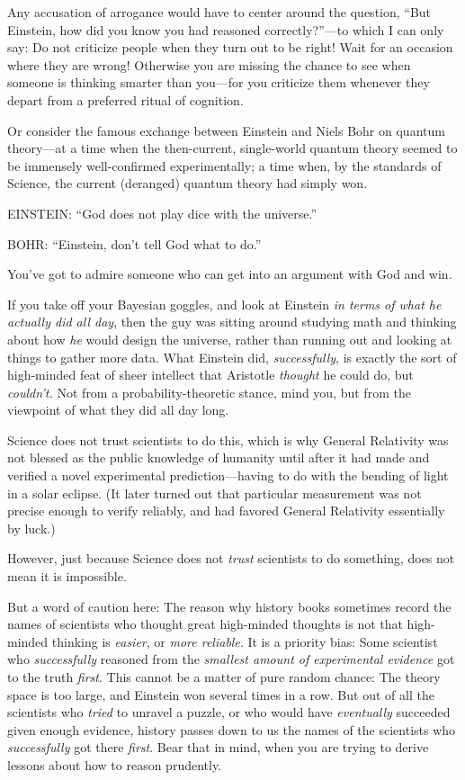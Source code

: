 {
 Any accusation of arrogance would have to center around the
question, ``But Einstein, how did you know you had
reasoned correctly?''---to which I can only say: Do
not criticize people when they turn out to be right! Wait for an
occasion where they are wrong! Otherwise you are missing the chance to
see when someone is thinking smarter than you---for you criticize them
whenever they depart from a preferred ritual of cognition.}

{
 Or consider the famous exchange between Einstein and Niels Bohr on
quantum theory---at a time when the then-current, single-world quantum
theory seemed to be immensely well-confirmed experimentally; a time
when, by the standards of Science, the current (deranged) quantum
theory had simply won.}

{
 EINSTEIN: ``God does not play dice with the
universe.''}

{
 BOHR: ``Einstein, don't tell God
what to do.''}

{
 You've got to admire someone who can get into an
argument with God and win.}

{
 If you take off your Bayesian goggles, and look at Einstein
\textit{in terms of what he actually did all day}, then the guy was
sitting around studying math and thinking about how \textit{he} would
design the universe, rather than running out and looking at things to
gather more data. What Einstein did, \textit{successfully}, is exactly
the sort of high-minded feat of sheer intellect that Aristotle
\textit{thought} he could do, but \textit{couldn't.}
Not from a probability-theoretic stance, mind you, but from the
viewpoint of what they did all day long.}

{
 Science does not trust scientists to do this, which is why General
Relativity was not blessed as the public knowledge of humanity until
after it had made and verified a novel experimental prediction---having
to do with the bending of light in a solar eclipse. (It later turned
out that particular measurement was not precise enough to verify
reliably, and had favored General Relativity essentially by luck.)}

{
 However, just because Science does not \textit{trust} scientists
to do something, does not mean it is impossible.}

{
 But a word of caution here: The reason why history books sometimes
record the names of scientists who thought great high-minded thoughts
is not that high-minded thinking is \textit{easier}, or \textit{more
reliable}. It is a priority bias: Some scientist who
\textit{successfully} reasoned from the \textit{smallest amount of
experimental evidence} got to the truth \textit{first}. This cannot be
a matter of pure random chance: The theory space is too large, and
Einstein won several times in a row. But out of all the scientists who
\textit{tried} to unravel a puzzle, or who would have
\textit{eventually} succeeded given enough evidence, history passes
down to us the names of the scientists who \textit{successfully} got
there \textit{first}. Bear that in mind, when you are trying to derive
lessons about how to reason prudently.}

